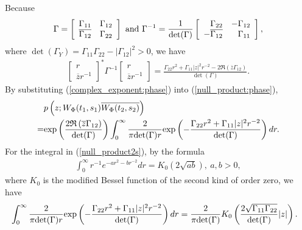 \documentclass{amsart}
\begin{document}
Because
\begin{align*}
\Gamma=
\left[\begin{array}{cc}\Gamma_{11} & \Gamma_{12}\\ \overline{\Gamma_{12}} & \Gamma_{22}\end{array}\right]
\ \textup{and}\
\Gamma^{-1}=
\frac{1}{\det(\Gamma)}\left[\begin{array}{rr}\Gamma_{22} & -\Gamma_{12}\\ -\overline{\Gamma_{12}} & \Gamma_{11}\end{array}\right],
\end{align*}
where $\det(\Gamma_{Y})=\Gamma_{11}  \Gamma_{22}-|\Gamma_{12}|^{2}>0$, we have
\begin{align}\label{complex_exponent:phase}
\left[\begin{array}{cc}r\\ \overline{z}r^{-1}\end{array}\right]^{*}
\Gamma^{-1}
\left[\begin{array}{cc}r\\ \overline{z}r^{-1}\end{array}\right]
=\frac{\Gamma_{22}r^{2}+\Gamma_{11}|z|^{2}r^{-2}-2\mathfrak{R}\left(\overline{z}\Gamma_{12}\right)}
{\det(\Gamma)}.
\end{align}
By substituting (\ref{complex_exponent:phase}) into (\ref{null_product:phase}),
\begin{align}\label{null_product2s}
&p\left(z;W_{\Phi}(t_{1},s_{1})\overline{W_{\Phi}(t_{2},s_{2})}\right)
\\\notag=&
\textup{exp}
\left(
\frac{2\mathfrak{R}\left(\overline{z}\Gamma_{12}
\right)}{\det(\Gamma)}\right)
\int_{0}^{\infty}\frac{2}{\pi\textup{det}(\Gamma)r}
\textup{exp}\left(-
\frac{\Gamma_{22}r^{2}+\Gamma_{11}|z|^{2}r^{-2}}
{\det(\Gamma)}
\right)dr.
\end{align}
For the integral in (\ref{null_product2s}),
by the formula
\begin{align*}
\int_{0}^{\infty}r^{-1}e^{-ar^{2}-br^{-2}}dr=K_{0}\left(2\sqrt{ab}\right),\ a,b>0,
\end{align*}
where $K_{0}$ is the modified Bessel function of the second kind of order zero,
we have
\begin{align}\label{K0_apps}
&\int_{0}^{\infty}\frac{2}{\pi\textup{det}(\Gamma)r}
\textup{exp}\left(-
\frac{\Gamma_{22}r^{2}+\Gamma_{11}|z|^{2}r^{-2}}
{\det(\Gamma)}
\right)dr
=\frac{2}{\pi\textup{det}(\Gamma)}K_{0}\left(\frac{2\sqrt{\Gamma_{11}\Gamma_{22}}}{\det(\Gamma)}|z|\right).
\end{align}
\end{document}
